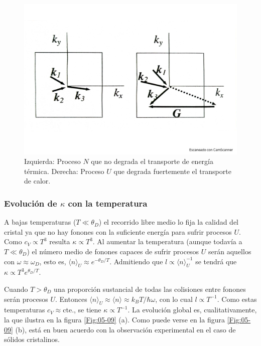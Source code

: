 \begin{figure}[h!] \centering
    \includegraphics[scale=0.35]{Cuerpo/Ch_05/Fotos libro 8.pdf}
    \caption{Izquierda: Proceso $N$ que no degrada el transporte de energía térmica. Derecha: Proceso $U$ que degrada fuertemente el transporte de calor.}
    \label{Fig:05-08}
\end{figure}    

\subsubsection{Evolución de $\kappa$ con la temperatura}

A bajas temperaturas ($T\ll \theta_D$) el recorrido libre medio lo fija la calidad del cristal ya que no hay fonones con la suficiente energía para sufrir procesos $U$. Como $c_V \propto T^3$ resulta $\kappa \propto T^3$. Al aumentar la temperatura (aunque todavía a $T\ll \theta_D$) el número medio de fonones capaces de sufrir procesos $U$ serán aquellos con $\omega\approx\omega_D$, esto es, $\langle n\rangle_U \approx e^{-\theta_D / T}$. Admitiendo que $l\propto \langle n \rangle_U^{-1}$ se tendrá que $\kappa \propto T^3 e^{\theta_D/T}$. 

Cuando $T>\theta_D$ una proporción sustancial de todas las colisiones entre fonones serán procesos $U$. Entonces $\langle n \rangle_U \approx \langle n \rangle \approx k_B T / \hbar \omega$, con lo cual $l \propto T^{-1}$. Como estas temperaturas $c_V\approx$cte., se tiene $\kappa \propto T^{-1}$. La evolución global es, cualitativamente, la que ilustra en la figura \ref{Fig:05-09} (a). Como puede verse en la figura \ref{Fig:05-09} (b), está en buen acuerdo con la observación experimental en el caso de sólidos cristalinos.

